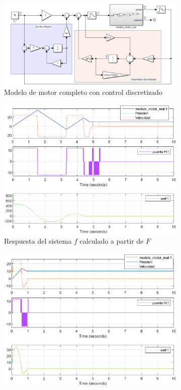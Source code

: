 \documentclass[10pt,a4paper]{report}
\begin{document}
\begin{figure}
\centering
\begin{subfigure}{0.6\textwidth}
\includegraphics[width=\textwidth]{motor_controlado.jpg}
\caption{Modelo de motor completo con control discretizado}
\label{f35a}
\end{subfigure}
\begin{subfigure}{0.6\textwidth}
\includegraphics[width=\textwidth]{motor_controlado.eps}
\caption{Respuesta del sistema $f$ calculado a partir de $F$}
\label{f35b}
\end{subfigure}
\begin{subfigure}{0.6\textwidth}
\includegraphics[width=\textwidth]{motor_controlado_f0.eps}

\end{subfigure}
\end{figure}
\end{document}
